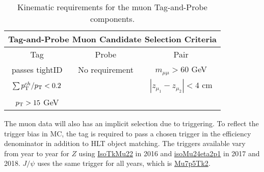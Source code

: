 \begin{table}
\small
\caption{Kinematic requirements for the muon Tag-and-Probe components.}
\centering
\begin{tabular}{|c|c|c|}
\hline 
\multicolumn{3}{|c|}{Tag-and-Probe Muon Candidate Selection Criteria} \\ 
\hline 
\hline
Tag & Probe & Pair \\ 
\hline 
\hline
passes tightID & No requirement & $m_{\mu\mu} > 60$ GeV \\
$\sum p_{\mathrm{T}}^{ch} / p_{\mathrm{T}} < 0.2$ & &  $|z_{\mu_1} - z_{\mu_2}| <4 $ cm \\
$p_{\mathrm{T}} > 15$ GeV &   &   \\
\hline 
\end{tabular} 
\label{tab:mutpnselect}
\end{table}

The muon data will also has an implicit selection due to triggering. To reflect the trigger bias in MC, the tag is required to pass a chosen trigger in the efficiency denominator in addition to HLT object matching. The triggers available vary from year to year for $Z$ using \url{IsoTkMu22} in 2016 and \url{isoMu24eta2p1} in 2017 and 2018. $J/\psi$ uses the same trigger for all years, which is \url{Mu7p5Tk2}.\\






